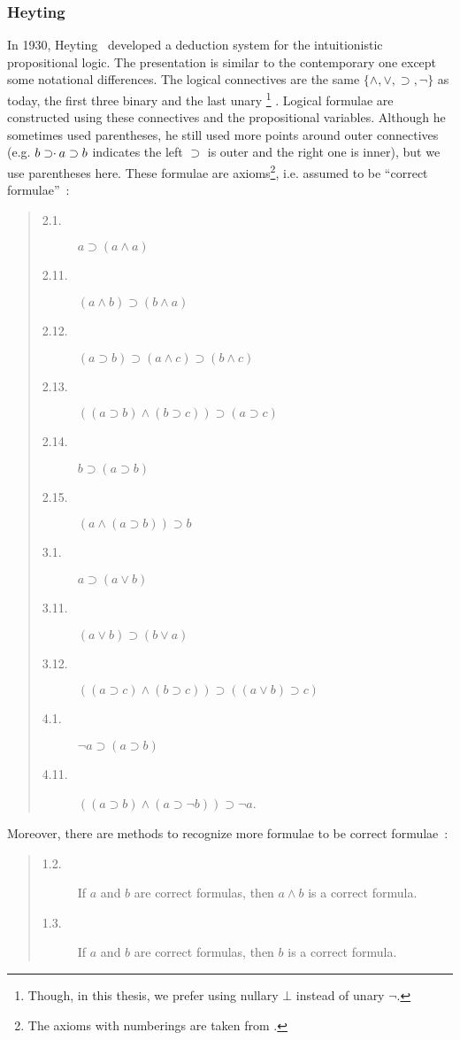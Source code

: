 \subsubsection{Heyting}
In 1930, Heyting~\cite{heyting1930} developed a deduction
system for the
intuitionistic propositional logic.  The presentation is similar to
the contemporary one except some notational differences.  The
logical connectives are the same $\{\wedge,\vee,\supset,\neg\}$ as today, the
first three binary and the last unary%
\footnote{Though, in this thesis, we prefer using nullary $\bot$ instead of unary
$\neg.$}%
.  Logical formulae are constructed
using these connectives and the propositional variables.
Although he sometimes used parentheses, he still used more points
around outer connectives (e.g. $b\supset \kern -3pt\cdot \kern 2pt  a
\supset b$ indicates the left $\supset$ is outer and the right one is
inner), but we use parentheses here.
These formulae are axioms\footnote{The axioms with numberings are taken
from \citet{heyting1930}.}, i.e. assumed to be
``correct formulae''~\cite{heyting1930}:
 \begin{quotation}\noindent
\begin{description}
 \item[2.1.] $a\supset (a\land a)$
 \item[2.11.] $(a\land b)\supset (b\land a)$
 \item[2.12.] $(a\supset b)\supset (a\land c)\supset (b\land c)$
 \item[2.13.] $((a\supset b)\land (b\supset c))\supset (a\supset c)$
 \item[2.14.] $b\supset (a\supset b)$
 \item[2.15.] $(a\land (a\supset b))\supset b$
 \item[3.1.] $a\supset (a\lor b)$
 \item[3.11.] $(a\lor b)\supset (b\lor a)$
 \item[3.12.] $((a\supset c)\land(b\supset c))\supset ((a\lor b)\supset
      c)$
 \item[4.1.] $\neg a\supset (a\supset b)$
 \item[4.11.] $((a\supset b)\land (a\supset \neg b)) \supset \neg a$\enspace.
\end{description}
 \end{quotation}
Moreover, there are methods to recognize more formulae to be correct
formulae~\cite{heyting1930}:
 \begin{quotation}\noindent
\begin{description}
 \item[1.2.] If $a$ and $b$ are correct formulas, then $a\land b$ is a correct
       formula.
 \item[1.3.] If $a$ and $b$ are correct formulas, then $b$ is a correct formula.
\end{description}
 \end{quotation}

